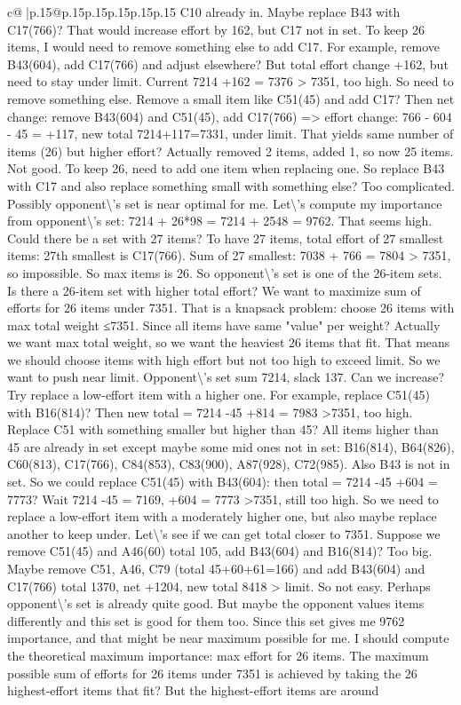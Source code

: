 \documentclass{article}
\begin{document}
{\begin{supertabular}{c@{$\;$}|p{.15\linewidth}@{}p{.15\linewidth}p{.15\linewidth}p{.15\linewidth}p{.15\linewidth}p{.15\linewidth}}
{{{C10 already in. Maybe replace B43 with C17(766)? That would increase effort by 162, but C17 not in set. To keep 26 items, I would need to remove something else to add C17. For example, remove B43(604), add C17(766) and adjust elsewhere? But total effort change +162, but need to stay under limit. Current 7214 +162 = 7376 > 7351, too high. So need to remove something else. Remove a small item like C51(45) and add C17? Then net change: remove B43(604) and C51(45), add C17(766) => effort change: 766 {-} 604 {-} 45 = +117, new total 7214+117=7331, under limit. That yields same number of items (26) but higher effort? Actually removed 2 items, added 1, so now 25 items. Not good. To keep 26, need to add one item when replacing one. So replace B43 with C17 and also replace something small with something else? Too complicated. Possibly opponent\textbackslash{}'s set is near optimal for me. Let\textbackslash{}'s compute my importance from opponent\textbackslash{}'s set: 7214 + 26*98 = 7214 + 2548 = 9762. That seems high. Could there be a set with 27 items? To have 27 items, total effort of 27 smallest items: 27th smallest is C17(766). Sum of 27 smallest: 7038 + 766 = 7804 > 7351, so impossible. So max items is 26. So opponent\textbackslash{}'s set is one of the 26{-}item sets. Is there a 26{-}item set with higher total effort? We want to maximize sum of efforts for 26 items under 7351. That is a knapsack problem: choose 26 items with max total weight ≤7351. Since all items have same "value" per weight? Actually we want max total weight, so we want the heaviest 26 items that fit. That means we should choose items with high effort but not too high to exceed limit. So we want to push near limit. Opponent\textbackslash{}'s set sum 7214, slack 137. Can we increase? Try replace a low{-}effort item with a higher one. For example, replace C51(45) with B16(814)? Then new total = 7214 {-}45 +814 = 7983 >7351, too high. Replace C51 with something smaller but higher than 45? All items higher than 45 are already in set except maybe some mid ones not in set: B16(814), B64(826), C60(813), C17(766), C84(853), C83(900), A87(928), C72(985). Also B43 is not in set. So we could replace C51(45) with B43(604): then total = 7214 {-}45 +604 = 7773? Wait 7214 {-}45 = 7169, +604 = 7773 >7351, still too high. So we need to replace a low{-}effort item with a moderately higher one, but also maybe replace another to keep under. Let\textbackslash{}'s see if we can get total closer to 7351. Suppose we remove C51(45) and A46(60) total 105, add B43(604) and B16(814)? Too big. Maybe remove C51, A46, C79 (total 45+60+61=166) and add B43(604) and C17(766) total 1370, net +1204, new total 8418 > limit. So not easy. Perhaps opponent\textbackslash{}'s set is already quite good. But maybe the opponent values items differently and this set is good for them too. Since this set gives me 9762 importance, and that might be near maximum possible for me. I should compute the theoretical maximum importance: max effort for 26 items. The maximum possible sum of efforts for 26 items under 7351 is achieved by taking the 26 highest{-}effort items that fit? But the highest{-}effort items are around }}}
\end{supertabular}}
\end{document}

